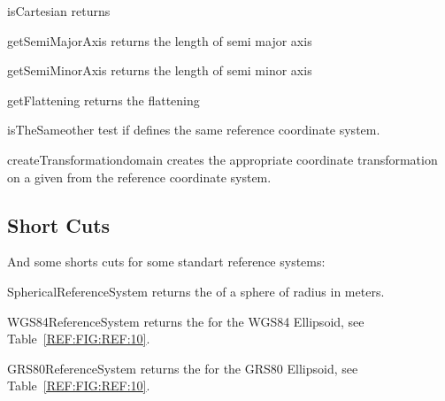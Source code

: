 \begin{methoddesc}[GeodeticReferenceSystem]{isCartesian}{}
returns \False 
\end{methoddesc}


\begin{methoddesc}[GeodeticReferenceSystem]{getSemiMajorAxis}{}
returns the length of semi major axis
\end{methoddesc}

\begin{methoddesc}[GeodeticReferenceSystem]{getSemiMinorAxis}{}
returns the length of semi minor axis
\end{methoddesc}

\begin{methoddesc}[GeodeticReferenceSystem]{getFlattening}{}
returns the flattening
\end{methoddesc}


\begin{methoddesc}[GeodeticReferenceSystem]{isTheSame}{other}
test if  defines the same reference coordinate system.
\end{methoddesc}

\begin{methoddesc}[GeodeticReferenceSystem]{createTransformation}{domain}
creates the appropriate coordinate transformation   on a given 
from the reference coordinate system.
\end{methoddesc}

\subsection{Short Cuts} 
And some shorts cuts for some standart reference systems:
\begin{funcdesc}{SphericalReferenceSystem}{}
returns the  of a sphere of radius  in meters.
\end{funcdesc}

\begin{funcdesc}{WGS84ReferenceSystem}{}
returns the  for the WGS84 Ellipsoid, see Table~\ref{REF:FIG:REF:10}.
\end{funcdesc}

\begin{funcdesc}{GRS80ReferenceSystem}{}
returns the  for the GRS80 Ellipsoid, see Table~\ref{REF:FIG:REF:10}.
\end{funcdesc}

